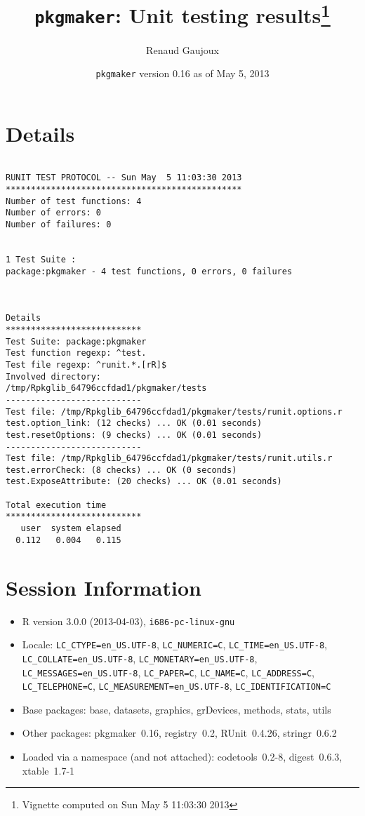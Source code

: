 \documentclass[10pt]{article}
\author{Renaud Gaujoux}
\title{\texttt{pkgmaker}: Unit testing results\footnote{Vignette computed  on Sun May  5 11:03:30 2013}}
\date{\texttt{pkgmaker} version 0.16 as of May  5, 2013}
\begin{document}
\maketitle

\section{Details}
\begin{verbatim}

RUNIT TEST PROTOCOL -- Sun May  5 11:03:30 2013 
*********************************************** 
Number of test functions: 4 
Number of errors: 0 
Number of failures: 0 

 
1 Test Suite : 
package:pkgmaker - 4 test functions, 0 errors, 0 failures



Details 
*************************** 
Test Suite: package:pkgmaker 
Test function regexp: ^test. 
Test file regexp: ^runit.*.[rR]$ 
Involved directory: 
/tmp/Rpkglib_64796ccfdad1/pkgmaker/tests 
--------------------------- 
Test file: /tmp/Rpkglib_64796ccfdad1/pkgmaker/tests/runit.options.r 
test.option_link: (12 checks) ... OK (0.01 seconds)
test.resetOptions: (9 checks) ... OK (0.01 seconds)
--------------------------- 
Test file: /tmp/Rpkglib_64796ccfdad1/pkgmaker/tests/runit.utils.r 
test.errorCheck: (8 checks) ... OK (0 seconds)
test.ExposeAttribute: (20 checks) ... OK (0.01 seconds)

Total execution time
***************************
   user  system elapsed 
  0.112   0.004   0.115 

\end{verbatim}

\section*{Session Information}
\begin{itemize}\raggedright
  \item R version 3.0.0 (2013-04-03), \verb|i686-pc-linux-gnu|
  \item Locale: \verb|LC_CTYPE=en_US.UTF-8|, \verb|LC_NUMERIC=C|, \verb|LC_TIME=en_US.UTF-8|, \verb|LC_COLLATE=en_US.UTF-8|, \verb|LC_MONETARY=en_US.UTF-8|, \verb|LC_MESSAGES=en_US.UTF-8|, \verb|LC_PAPER=C|, \verb|LC_NAME=C|, \verb|LC_ADDRESS=C|, \verb|LC_TELEPHONE=C|, \verb|LC_MEASUREMENT=en_US.UTF-8|, \verb|LC_IDENTIFICATION=C|
  \item Base packages: base, datasets, graphics, grDevices, methods,
    stats, utils
  \item Other packages: pkgmaker~0.16, registry~0.2, RUnit~0.4.26,
    stringr~0.6.2
  \item Loaded via a namespace (and not attached): codetools~0.2-8,
    digest~0.6.3, xtable~1.7-1
\end{itemize}
\end{document}
